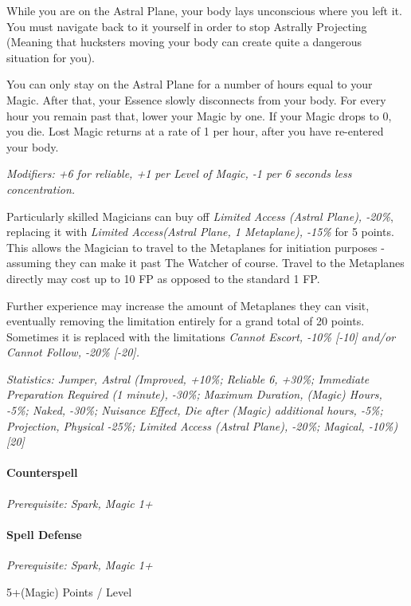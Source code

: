 \begin{multicols*}{3}
	While you are on the Astral Plane, your body lays unconscious where you left it. You must navigate back to it yourself in order to stop Astrally Projecting (Meaning that hucksters moving your body can create quite a dangerous situation for you).
	
	You can only stay on the Astral Plane for a number of hours equal to your Magic. After that, your Essence slowly disconnects from your body. For every hour you remain past that, lower your Magic by one. If your Magic drops to 0, you die. Lost Magic returns at a rate of 1 per hour, after you have re-entered your body.
	
	\textit{\textcolor{NavyBlue}{Modifiers: +6 for reliable, +1 per Level of Magic, -1 per 6 seconds less concentration.}}
	
	Particularly skilled Magicians can buy off \textit{Limited Access (Astral Plane), -20\%}, replacing it with \textit{Limited Access(Astral Plane, 1 Metaplane), -15\%} for 5 points. This allows the Magician to travel to the Metaplanes for initiation purposes - assuming they can make it past The Watcher of course. Travel to the Metaplanes directly may cost up to 10 FP as opposed to the standard 1 FP. 
	
	Further experience may increase the amount of Metaplanes they can visit, eventually removing the limitation entirely for a grand total of 20 points. Sometimes it is replaced with the limitations \textit{Cannot Escort, -10\% [-10] and/or Cannot Follow, -20\% [-20].}
	
	\textit{\textcolor{OliveGreen}{Statistics: Jumper, Astral (Improved, +10\%; Reliable 6, +30\%; Immediate Preparation Required (1 minute), -30\%; Maximum Duration, (Magic) Hours, -5\%; Naked, -30\%; Nuisance Effect, Die after (Magic) additional hours, -5\%; Projection, Physical -25\%;  Limited Access (Astral Plane), -20\%; Magical, -10\%) [20]}}
	
	\paragraph{Counterspell}\label{counterspell}
	\textit{Prerequisite: Spark, Magic 1+}
	\begin{flushright}
		
	\end{flushright}
	
	

	
	\paragraph{Spell Defense}\label{spell_defense}
	\textit{Prerequisite: Spark, Magic 1+}
	\begin{flushright}
		5+(Magic) Points / Level
	\end{flushright}
	

\end{multicols*}
